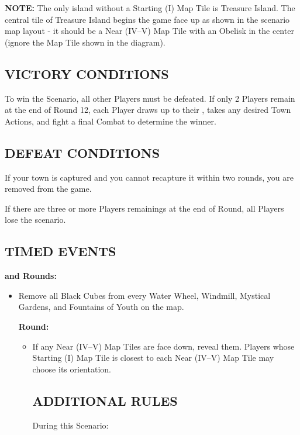 \begin{multicols*}{2}
\begin{itemize}
\textbf{\MakeUppercase{Note:}} The only island without a Starting (I) Map Tile is Treasure Island. The central tile of Treasure Island begins the game face up as shown in the scenario map layout - it should be a Near (IV--V) Map Tile with an Obelisk in the center (ignore the Map Tile shown in the diagram).

\subsection*{\MakeUppercase{Victory Conditions}}
To win the Scenario, all other Players must be defeated. If only 2 Players remain at the end of Round 12, each Player draws up to their , takes any desired Town Actions, and fight a final Combat to determine the winner.

\subsection*{\MakeUppercase{Defeat Conditions}}
If your town is captured and you cannot recapture it within two rounds, you are removed from the game.

If there are three or more Players remainings at the end of  Round, all Players lose the scenario.

\subsection*{\MakeUppercase{Timed Events}}

\textbf{ and  Rounds:}
\begin{itemize}
  \item Remove all Black Cubes from every Water Wheel, Windmill, Mystical Gardens, and Fountains of Youth on the map.

\textbf{ Round:}
\begin{itemize}
  \item If any Near (IV--V) Map Tiles are face down, reveal them. Players whose Starting (I) Map Tile is closest to each Near (IV--V) Map Tile may choose its orientation.

\subsection*{\MakeUppercase{Additional Rules}}

During this Scenario:


\end{itemize}
\end{itemize}
\end{itemize}
\end{multicols*}
